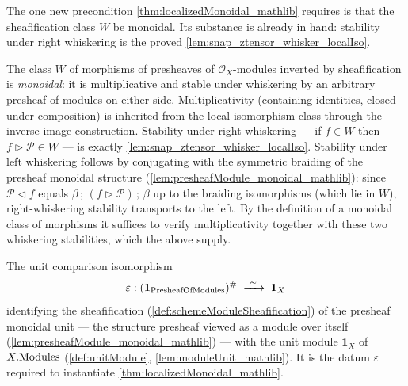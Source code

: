 The one new precondition \cref{thm:localizedMonoidal_mathlib} requires is that the
sheafification class \(W\) be monoidal. Its substance is already in hand: stability
under right whiskering is the proved \cref{lem:snap_ztensor_whisker_localIso}.

\begin{definition}
  \label{def:W_isMonoidal}
  The class \(W\) of morphisms of presheaves of \(\mathcal{O}_X\)-modules inverted
  by sheafification is \emph{monoidal}: it is multiplicative and stable under
  whiskering by an arbitrary presheaf of modules on either side.
  Multiplicativity (containing identities, closed under composition) is inherited
  from the local-isomorphism class through the inverse-image construction. Stability under right
  whiskering --- if \(f \in W\) then \(f \rhd \mathcal{P} \in W\) --- is exactly
  \cref{lem:snap_ztensor_whisker_localIso}. Stability under left
  whiskering follows by conjugating with the symmetric braiding of the presheaf
  monoidal structure (\cref{lem:presheafModule_monoidal_mathlib}): since
  \(\mathcal{P} \lhd f\) equals \(\beta \,;\, (f \rhd \mathcal{P}) \,;\, \beta\) up
  to the braiding isomorphisms (which lie in \(W\)), right-whiskering stability
  transports to the left. By the definition of a monoidal class of morphisms it suffices
  to verify multiplicativity together with these two whiskering stabilities, which
  the above supply.
\end{definition}

\begin{definition}
  \label{def:localizedMonoidalUnitIso}
  The unit comparison isomorphism
  \[
    \varepsilon :
      (\mathbf{1}_{\mathrm{PresheafOfModules}})^{\#}
      \;\xrightarrow{\ \sim\ }\; \mathbf{1}_X
  \]
  identifying the sheafification (\cref{def:schemeModuleSheafification}) of the
  presheaf monoidal unit --- the structure presheaf viewed as a module over itself
  (\cref{lem:presheafModule_monoidal_mathlib}) --- with the unit module
  \(\mathbf{1}_X\) of \(X.\mathrm{Modules}\) (\cref{def:unitModule},
  \cref{lem:moduleUnit_mathlib}). It is the datum \(\varepsilon\) required to
  instantiate \cref{thm:localizedMonoidal_mathlib}.
\end{definition}


